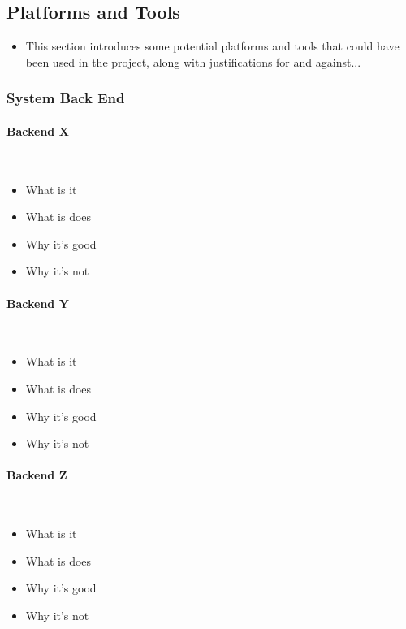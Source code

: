 \subsection{Platforms and Tools}
\label{sec:pat}

{\color{red}
	\begin{itemize}
		\item This section introduces some potential platforms and tools that could have been used in the project, along with justifications for and against...
	\end{itemize}
}

\subsubsection{System Back End}
\paragraph{Backend X}\ \\
{\color{red}
	\begin{itemize}
		\item What is it
		\item What is does
		\item Why it's good
		\item Why it's not
	\end{itemize}
}
\paragraph{Backend Y}\ \\
{\color{red}
	\begin{itemize}
		\item What is it
		\item What is does
		\item Why it's good
		\item Why it's not
	\end{itemize}
}
\paragraph{Backend Z}\ \\
{\color{red}
	\begin{itemize}
		\item What is it
		\item What is does
		\item Why it's good
		\item Why it's not
	\end{itemize}
}


